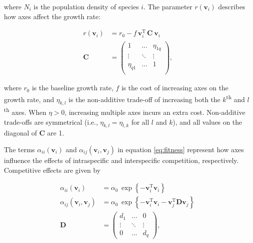 \noindent where $N_i$ is the population density of species $i$.
The parameter $r(\mathbf{v}_i)$ describes how axes affect
the growth rate:

\begin{equation} \label{eq:growth-rate}
\begin{split}
    r(\mathbf{v}_i) &= r_0 - f \, \mathbf{v}_i^{\textrm{T}} \, \mathbf{C} ~ \mathbf{v}_{i} \\
    \mathbf{C} &= \begin{pmatrix}
        1         & \ldots & \eta_{1q} \\
        \vdots    & \ddots & \vdots \\
        \eta_{q1} & \ldots & 1      \\
        \end{pmatrix}
    \textrm{,}
\end{split}
\end{equation}

\noindent where $r_0$ is the baseline growth rate,
$f$ is the cost of increasing axes on the growth rate, and
$\eta_{k,l}$ is the non-additive trade-off of increasing both the
$k$\textsuperscript{th} and $l$\textsuperscript{th} axes.
When $\eta > 0$, increasing multiple axes incurs an extra cost.
Non-additive trade-offs are symmetrical (i.e., $\eta_{k,l} = \eta_{l,k}$ for all
$l$ and $k$), and all values on the diagonal of $\mathbf{C}$ are 1.


The terms $\alpha_{ii}(\mathbf{v}_i)$ and
$\alpha_{ij}(\mathbf{v}_i, \mathbf{v}_j)$
in equation \ref{eq:fitness} represent how axes influence the effects
of intraspecific and interspecific competition, respectively.
Competitive effects are given by

\begin{equation} \label{eq:competition}
\begin{split}
    \alpha_{ii}(\mathbf{v}_i) &= \alpha_0 ~\exp \left\{
        - \mathbf{v}_i^{\textrm{T}}
        \mathbf{v}_i \right\} \\
    \alpha_{ij}(\mathbf{v}_i, \mathbf{v}_j) &= \alpha_0 ~\exp \left\{
        - \mathbf{v}_i^{\textrm{T}} \mathbf{v}_i -
        \mathbf{v}_j^{\textrm{T}} \mathbf{D} \mathbf{v}_j \right\} \\
    \mathbf{D} &= \begin{pmatrix}
        d_1     & \ldots    & 0 \\
        \vdots  & \ddots    & \vdots \\
        0       & \ldots    & d_q
        \end{pmatrix}
	\textrm{,}
\end{split}
\end{equation}



